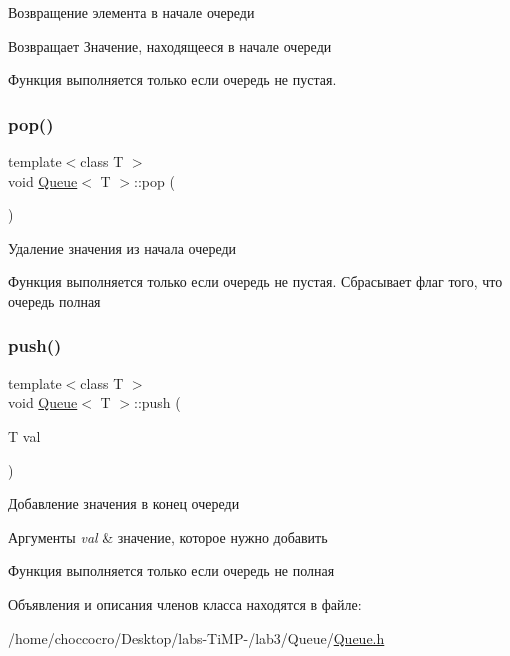 Возвращение элемента в начале очереди 

\begin{DoxyReturn}{Возвращает}
Значение, находящееся в начале очереди
\end{DoxyReturn}
Функция выполняется только если очередь не пустая. \mbox{\label{classQueue_a02ea784625fe33b5793d00c3b02b4878}} 
\subsubsection{\texorpdfstring{pop()}{pop()}}
{\footnotesize\ttfamily template$<$class T $>$ \\
void \hyperlink{classQueue}{Queue}$<$ T $>$\+::pop (\begin{DoxyParamCaption}{ }\end{DoxyParamCaption})\hspace{0.3cm}{\ttfamily [inline]}}



Удаление значения из начала очереди 

Функция выполняется только если очередь не пустая. Сбрасывает флаг того, что очередь полная \mbox{\label{classQueue_a296728a60552a6676313379be7e0bc8a}} 
\subsubsection{\texorpdfstring{push()}{push()}}
{\footnotesize\ttfamily template$<$class T $>$ \\
void \hyperlink{classQueue}{Queue}$<$ T $>$\+::push (\begin{DoxyParamCaption}\item[{T}]{val }\end{DoxyParamCaption})\hspace{0.3cm}{\ttfamily [inline]}}



Добавление значения в конец очереди 


\begin{DoxyParams}{Аргументы}
{\em val} & значение, которое нужно добавить\\
\hline
\end{DoxyParams}
Функция выполняется только если очередь не полная 

Объявления и описания членов класса находятся в файле\+:\begin{DoxyCompactItemize}
\item 
/home/choccocro/\+Desktop/labs-\/\+Ti\+M\+P-\//lab3/\+Queue/\hyperlink{Queue_8h}{Queue.\+h}\end{DoxyCompactItemize}
